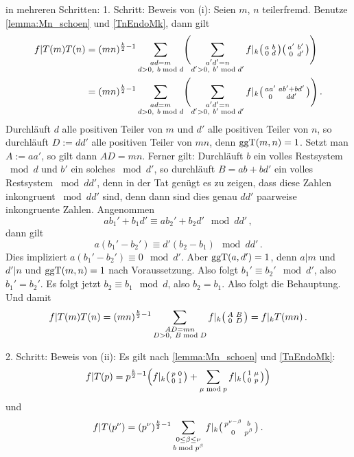 \begin{bewe}
	in mehreren Schritten:
	1. Schritt: Beweis von (i):
	Seien $m$, $n$ teilerfremd.
	Benutze \autoref{lemma:Mn_schoen} und \autoref{TnEndoMk}, dann gilt
	\begin{align*}
	f|T(m)T(n)
	&= (mn)^{\frac{k}{2}-1} \sum_{\substack{ad=m \vphantom{d'} \\ d>0,\ \vphantom{b'}b\bmod d}} \Biggl(\sum_{\substack{a'd' = n\\ d'>0,\ b' \bmod d'}} f|_k \mymat ab0d \mymat{a'}{b'}{0}{d'} \Biggr) \\
	&= (mn)^{\frac{k}{2}-1} \sum_{\substack{ad=m \vphantom{d'} \\ d>0,\ \vphantom{b'}b\bmod d}} \Biggl(\sum_{\substack{a'd' = n\\ d'>0,\ b' \bmod d'}} f|_k \mymat{aa'}{ab'+bd'}{0}{dd'} \Biggr)
	\,.
	\end{align*}
	Durchläuft $d$ alle positiven Teiler von $m$ und $d'$ alle positiven Teiler von $n$, so durchläuft $D := dd'$ alle positiven Teiler von $mn$, denn $\operatorname{ggT}(m, n) = 1$.
	Setzt man $A := aa'$, so gilt dann $AD = mn$.
	Ferner gilt: Durchläuft $b$ ein volles Restsystem $\bmod d$ und $b'$ ein solches $\bmod d'$, so durchläuft $B = ab+bd'$ ein volles Restsystem $\bmod dd'$, denn in der Tat genügt es zu zeigen, dass diese Zahlen inkongruent $\bmod dd'$ sind, denn dann sind dies genau $dd'$ paarweise inkongruente Zahlen.
	Angenommen
	\[
	ab_1' + b_1d' \equiv ab_2' +b_2d' \mod dd'
	\,,
	\]
	dann gilt
	\[
	a(b_1' - b_2') \equiv d'(b_2 - b_1) \mod dd'
	\,.
	\]
	Dies impliziert $a(b_1'- b_2') \equiv 0 \mod d'$. Aber $\operatorname{ggT}(a, d') = 1$, denn $a|m$ und $d'|n$ und $\operatorname{ggT}(m, n) = 1$ nach Voraussetzung.
	Also folgt $b_1' \equiv b_2' \mod d'$, also $b_1' = b_2'$.
	Es folgt jetzt $b_2 \equiv b_1 \mod d$, also $b_2 = b_1$.
	Also folgt die Behauptung.
	Und damit
	\[
	f|T(m)T(n)
	= (mn)^{\frac{k}{2}-1} \sum_{\substack{AD = mn\\ D > 0,\ B \bmod D}} f|_k \mymat AB0D
	= f|_kT(mn)
	\,.
	\]
	
	
	2. Schritt: Beweis von (ii):
	Es gilt nach \autoref{lemma:Mn_schoen} und \autoref{TnEndoMk}:
	\[
	f|T(p) = p^{\frac{k}{2}-1} \Bigl(f|_k \mymat p001 + \sum_{\mu \bmod p} f|_k \mymat 1\mu0p \Bigr)
	\]
	und
	\[
	f|T(p^\nu) = (p^\nu)^{\frac{k}{2}-1} \sum_{\substack{0 \leq \beta \leq \nu \\ b \bmod p^\beta}} f|_k \mymat{p^{\nu-\beta}}b0{p^\beta}
	\,.
	\]
	

\end{bewe}
